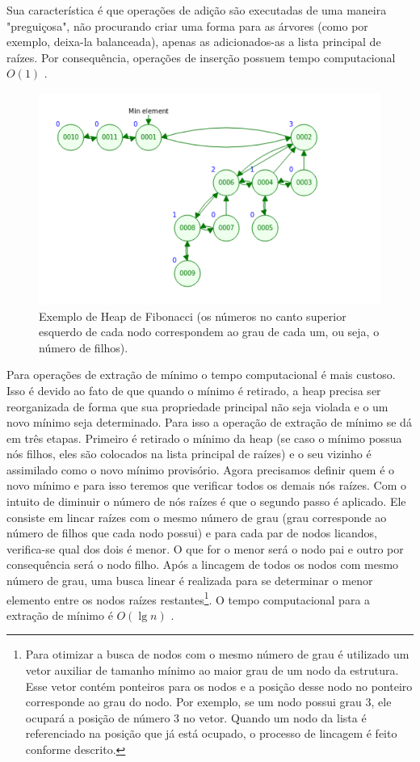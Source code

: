 Sua característica é que operações de adição são executadas de uma maneira "preguiçosa", não procurando criar uma forma para as árvores (como por exemplo, deixa-la balanceada), apenas as adicionados-as a lista principal de raízes. Por consequência, operações de inserção possuem tempo computacional $O(1)$ \cite{cormen2009introduction}.

\begin{figure}[H]
\centering
\includegraphics[width=.54\textwidth]{figuras/fibonacci-heap1} 
\caption{Exemplo de Heap de Fibonacci (os números no canto superior esquerdo de cada nodo correspondem ao grau de cada um, ou seja, o número de filhos).}
\label{fig-dijkstra-heapfibonacci1}
\end{figure}

Para operações de extração de mínimo o tempo computacional é mais custoso. Isso é devido ao fato de que quando o mínimo é retirado, a heap precisa ser reorganizada de forma que sua propriedade principal não seja violada e o um novo mínimo seja determinado. Para isso a operação de extração de mínimo se dá em três etapas. Primeiro é retirado o mínimo da heap (se caso o mínimo possua nós filhos, eles são colocados na lista principal de raízes) e o seu vizinho é assimilado como o novo mínimo provisório. Agora precisamos definir quem é o novo mínimo e para isso teremos que verificar todos os demais nós raízes. Com o intuito de diminuir o número de nós raízes é que o segundo passo é aplicado.  Ele consiste em lincar raízes com o mesmo número de grau (grau corresponde ao número de filhos que cada nodo possui) e para cada par de nodos licandos, verifica-se qual dos dois é menor. O que for o menor será o nodo pai e outro por consequência será o nodo filho. Após a lincagem de todos os nodos com mesmo número de grau, uma busca linear é realizada para se determinar o menor elemento entre os nodos raízes restantes\footnote{Para otimizar a busca de nodos com o mesmo número de grau é utilizado um vetor auxiliar de tamanho mínimo ao maior grau de um nodo da estrutura. Esse vetor contém ponteiros para os nodos e a posição desse nodo no ponteiro corresponde ao grau do nodo. Por exemplo, se um nodo possui grau 3, ele ocupará a posição de número 3 no vetor. Quando um nodo da lista é referenciado na posição que já está ocupado, o processo de lincagem é feito conforme descrito.}. O tempo computacional para a extração de mínimo é $O(\lg n)$ \cite{cormen2009introduction}.

